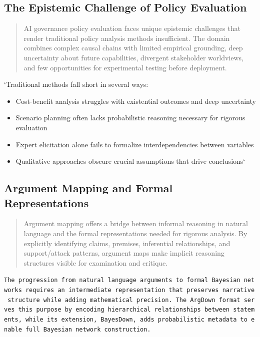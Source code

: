 \documentclass[]{book}
\providecommand{\tightlist}{%
  \setlength{\itemsep}{0pt}\setlength{\parskip}{0pt}}
\begin{document}
\subsection{The Epistemic Challenge of Policy
Evaluation}\label{sec-epistemic-challenge}

\begin{quote}
AI governance policy evaluation faces unique epistemic challenges that
render traditional policy analysis methods insufficient. The domain
combines complex causal chains with limited empirical grounding, deep
uncertainty about future capabilities, divergent stakeholder worldviews,
and few opportunities for experimental testing before deployment.
\end{quote}

`Traditional methods fall short in several ways:

\begin{itemize}
\tightlist
\item
  Cost-benefit analysis struggles with existential outcomes and deep
  uncertainty
\item
  Scenario planning often lacks probabilistic reasoning necessary for
  rigorous evaluation
\item
  Expert elicitation alone fails to formalize interdependencies between
  variables
\item
  Qualitative approaches obscure crucial assumptions that drive
  conclusions`
\end{itemize}

\subsection{Argument Mapping and Formal
Representations}\label{sec-argument-mapping}

\begin{quote}
Argument mapping offers a bridge between informal reasoning in natural
language and the formal representations needed for rigorous analysis. By
explicitly identifying claims, premises, inferential relationships, and
support/attack patterns, argument maps make implicit reasoning
structures visible for examination and critique.
\end{quote}

\texttt{The\ progression\ from\ natural\ language\ arguments\ to\ formal\ Bayesian\ networks\ requires\ an\ intermediate\ representation\ that\ preserves\ narrative\ structure\ while\ adding\ mathematical\ precision.\ The\ ArgDown\ format\ serves\ this\ purpose\ by\ encoding\ hierarchical\ relationships\ between\ statements,\ while\ its\ extension,\ BayesDown,\ adds\ probabilistic\ metadata\ to\ enable\ full\ Bayesian\ network\ construction.}
\end{document}
